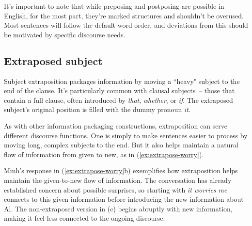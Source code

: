 \ex 
{}
\z

\ex \label{ex:postposing-end}
\z
\z

It's important to note that while preposing and postposing are possible in English, for the most part, they're marked structures and shouldn't be overused. Most sentences will follow the default word order, and deviations from this should be motivated by specific discourse needs.

\subsection{Extraposed subject} \label{sec:extraposition}

Subject extraposition packages information by moving a ``heavy" subject to the end of the clause. It's particularly common with clausal subjects~-- those that contain a full clause, often introduced by \textit{that}, \textit{whether}, or \textit{if}. The extraposed subject's original position is filled with the dummy pronoun \textit{it}.

As with other information packaging constructions, extraposition can serve different discourse functions. One is simply to make sentences easier to process by moving long, complex subjects to the end. But it also helps maintain a natural flow of information from given to new, as in (\ref{ex:extrapose-worry}).

\ea\label{ex:extrapose-worry}
    \z
\z

Minh's response in (\ref{ex:extrapose-worry}b) exemplifies how extraposition helps maintain the given-to-new flow of information. The conversation has already established concern about possible surprises, so starting with \textit{it worries me} connects to this given information before introducing the new information about Al. The non-extraposed version in (c) begins abruptly with new information, making it feel less connected to the ongoing discourse.

